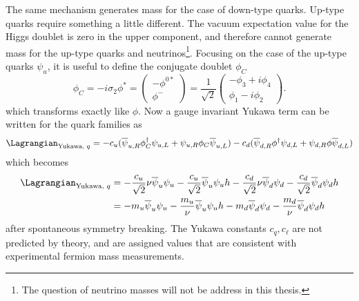 The same mechanism generates mass for the case of down-type quarks. Up-type quarks require something a little different. The vacuum expectation value for the Higgs doublet is zero in the upper component, and therefore cannot generate mass for the up-type quarks and neutrinos\footnote{The question of neutrino masses will not be address in this thesis.}. Focusing on the case of the up-type quarks $\psi_u$, it is useful to define the conjugate doublet $\phi_C$
\begin{equation}
    \phi_C = -i\sigma_2\phi^* = 
    \begin{pmatrix}
         -\phi^{0*} \\
         \phi^-
    \end{pmatrix}
    = \dfrac{1}{\sqrt{2}}
    \begin{pmatrix}
         -\phi_3+i\phi_4\\
         \phi_1-i\phi_2
    \end{pmatrix}.
\end{equation}
which transforms exactly like $\phi$. Now a gauge invariant Yukawa term can be written for the quark families as
\begin{equation}
    \Lagrangian_{\text{Yukawa, }q}=-c_u (\overline{\psi}_{u,R}\phi_C^{\dagger}\psi_{u,L}+\psi_{u,R}\phi_C\overline{\psi}_{u,L}) - c_d (\overline{\psi}_{d,R}\phi^{\dagger}\psi_{d,L}+\psi_{d,R}\phi\overline{\psi}_{d,L})
\end{equation}
which becomes
\begin{align}
    \Lagrangian_{\text{Yukawa, }q} & = - \dfrac{c_u}{\sqrt{2}}\nu\overline{\psi}_u\psi_u - \dfrac{c_u}{\sqrt{2}}\overline{\psi}_u\psi_uh - \dfrac{c_d}{\sqrt{2}}\nu\overline{\psi}_d\psi_d - \dfrac{c_d}{\sqrt{2}}\overline{\psi}_d\psi_dh \\
                & = -m_u\overline{\psi}_u\psi_u - \dfrac{m_u}{\nu}\overline{\psi}_u\psi_u h - m_d\overline{\psi}_d\psi_d - \dfrac{m_d}{\nu}\overline{\psi}_d\psi_d h
\end{align}
after spontaneous symmetry breaking.
The Yukawa constants $c_q, c_{\ell}$ are not predicted by theory, and are assigned values that are consistent with experimental fermion mass measurements. 